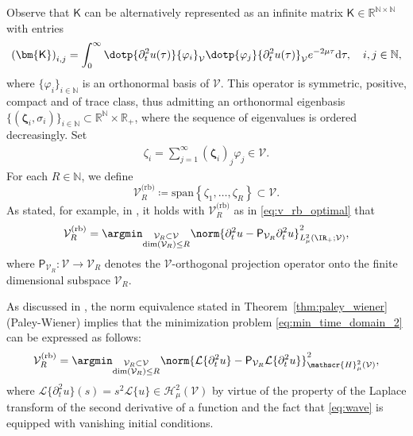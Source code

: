 Observe that $\mathsf{K}$ can be alternatively represented as an infinite matrix
${\bm{\mathsf{K}}} \in \mathbb{R}^{\mathbb{N} \times \mathbb{N}}$ with entries
\begin{equation}
	\left(
		{\bm{\mathsf{K}}}
	\right)_{i,j}
	=
	\int_{0}^{\infty} 
	\dotp{
		\partial^2_t {u}(\tau)
	}{
		\varphi_{i}
	}_{\mathcal{V}}
	\dotp{
		\varphi_{j}
	}{
		\partial^2_t {u}(\tau)
	}_{\mathcal{V}}
	e^{-2\mu \tau}
	\text{d}
	\tau,
    \quad
    i,j \in \mathbb{N},
\end{equation}
where $\{\varphi_{i}\}_{i \in \mathbb{N}}$ is an orthonormal basis of $\mathcal{V}$.
This operator is symmetric, positive, compact and of trace class, thus admitting an orthonormal eigenbasis $\{\left(\bm{\zeta}_i, \sigma_i\right)\}_{i\in \mathbb{N}} \subset \mathbb{R}^\mathbb{N} \times \mathbb{R}_+$, where the sequence of eigenvalues is
ordered decreasingly.  
Set
\begin{align}
	\zeta_{i}
	=
	\sum_{j=1}^{\infty}
	\left(
	\boldsymbol\zeta_{i}
	\right)_j
	\varphi_{j}
	\in 
	\mathcal{V}.
\end{align}
For each $R \in \mathbb{N}$, we define
\begin{equation}\label{eq:v_rb_optimal}
	\mathcal{V}^{\text{(rb)}}_R
	\coloneqq
	\text{span}
	\left\{	
		\zeta_1
		,
		\dots
		,
		\zeta_R
	\right\}
	\subset
	\mathcal{V}.
\end{equation}
%
As stated, for example, in \cite[Section 6.4]{quarteroni2015reduced}, it holds 
with $\mathcal{V}^{\text{(rb)}}_R$ as in \eqref{eq:v_rb_optimal} that
\begin{equation}\label{eq:min_time_domain_2}
	\mathcal{V}^{\text{(rb)}}_R
	=
	\argmin_{
	\substack{
		\mathcal{V}_R \subset \mathcal{V}
		\\
		\text{dim}(\mathcal{V}_R)\leq R	
	}
	}	
	\norm{
		\partial^2_t u
		-
		\mathsf{P}_{\mathcal{V}_R}
		\partial^2_t u
	}^2_{L^2_\mu(\IR_+;\mathcal{V})},
\end{equation}
where $\mathsf{P}_{\mathcal{V}_R}: \mathcal{V} \rightarrow \mathcal{V}_R$ denotes the
$\mathcal{V}$-orthogonal projection operator onto the finite dimensional subspace ${\mathcal{V}_R}$.

As discussed in \cite{henriquez2024fast}, the norm equivalence stated in Theorem~\ref{thm:paley_wiener} (Paley-Wiener) implies that
the minimization problem \eqref{eq:min_time_domain_2} can be expressed as follows:
\begin{equation}\label{eq:min_laplace_domain}
	\mathcal{V}^{\text{(rb)}}_R
	=
	\argmin_{
	\substack{
		\mathcal{V}_R \subset \mathcal{V}
		\\
		\text{dim}(\mathcal{V}_R)\leq R	
	}
	}	
	\norm{
		\mathcal{L}\{\partial^2_t u\}
		-
		\mathsf{P}_{\mathcal{V}_R}
		\mathcal{L}\{\partial^2_t u\}
	}^2_{\mathscr{H}^2_\mu(\mathcal{V})},
\end{equation}
where $ \mathcal{L}\{\partial^2_t u\}(s) = s^2 \mathcal{L}\{u\} \in \mathscr{H}^2_\mu(\mathcal{V})$
by virtue of the property of the Laplace transform of the second derivative of a function and the fact that 
\eqref{eq:wave} is equipped with vanishing initial conditions. 

